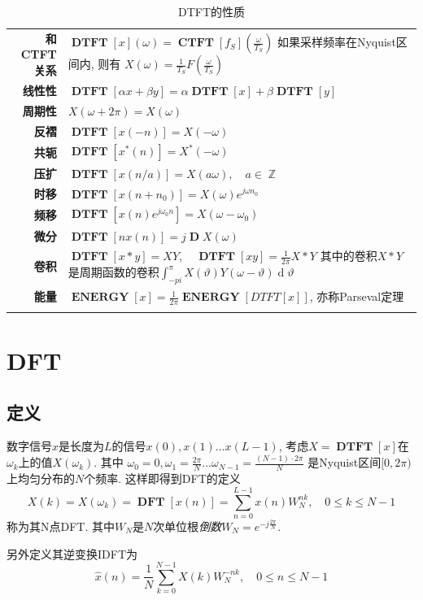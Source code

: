 \documentclass{ctexart}
\DeclareMathOperator{\CTFT}{\mathbf{CTFT}}
\DeclareMathOperator{\DTFT}{\mathbf{DTFT}}
\DeclareMathOperator{\DFT}{\mathbf{DFT}}
\DeclareMathOperator{\ENERGY}{\mathbf{ENERGY}}
\DeclareMathOperator{\D}{\mathbf{D}}
\DeclareMathOperator{\ud}{\mathrm{d}}
\DeclareMathOperator{\Zset}{\mathbb{Z}}
\newlength{\Oldarrayrulewidth}
\newcommand{\Hline}[1]{
  \noalign{\global\setlength{\Oldarrayrulewidth}{\arrayrulewidth}}
  \noalign{\global\setlength{\arrayrulewidth}{#1}}\hline
  \noalign{\global\setlength{\arrayrulewidth}{\Oldarrayrulewidth}}}
\newcommand{\Topline}{\Hline{0.08em}}
\newcommand{\Bottomline}{\Hline{0.08em}}
\begin{document}
    \begin{table}[ht!]
    \begin{tabularx}{\textwidth}{|>{\bfseries}r  L|}
        \Topline
        和CTFT关系 & $\displaystyle \DTFT[x](\omega) = \CTFT[f_S](\frac{\omega}{T_S})$
            如果采样频率在Nyquist区间内, 则有 $X(\omega) = \frac{1}{T_S} F\left(\frac{\omega}{T_S}\right)$\\
        线性性 & $\displaystyle \DTFT[\alpha x + \beta y] = \alpha \DTFT[x] + \beta \DTFT[y]$\\
        周期性 & $\displaystyle X(\omega + 2\pi) = X(\omega)$\\
        反褶 & $\displaystyle \DTFT[x(-n)] = X(-\omega)$\\
        共轭 & $\displaystyle \DTFT[x^*(n)] = X^*(-\omega)$\\
        压扩 & $\displaystyle \DTFT[x(n/a)] = X(a\omega), \quad a \in \Zset$\\
        时移 & $\displaystyle \DTFT[x(n + n_0)] = X(\omega) e^{j \omega n_0}$\\
        频移 & $\displaystyle \DTFT[x(n) e^{j \omega_0 n}] = X(\omega - \omega_0)$\\
        微分 & $\displaystyle \DTFT[nx(n)] = j \D X(\omega)$\\
        卷积 & $\displaystyle \DTFT[x * y] = X Y,\quad \DTFT[x y] = \frac{1}{2\pi} X * Y$
            其中的卷积$X * Y$是周期函数的卷积$\int_{-pi}^{\pi} X(\vartheta) Y(\omega - \vartheta) \ud \vartheta$\\
        能量 & $\displaystyle \ENERGY[x] = \frac{1}{2\pi} \ENERGY[DTFT[x]]$, 亦称Parseval定理\\
        \Bottomline
    \end{tabularx}
    \caption{DTFT的性质}
    \end{table}

\clearpage

\section{DFT}
\subsection{定义}
    数字信号$x$是长度为$L$的信号$x(0), x(1) \ldots x(L - 1)$,
    考虑$X = \DTFT[x]$在$\omega_k$上的值$X(\omega_k)$. 其中
    $\omega_0 = 0, \omega_1 = \frac{2\pi}{N} \ldots \omega_{N - 1} = \frac{(N-1) \cdot 2\pi}{N}$
    是Nyquist区间$[0, 2\pi)$上均匀分布的$N$个频率. 这样即得到DFT的定义
    \[
        X(k) = X(\omega_k) = \DFT[x(n)] = \sum_{n = 0}^{L - 1} x(n) W_N^{nk},\quad 0 \le k \le N - 1\]
    称为其N点DFT. 其中$W_N$是$N$次单位根\emph{倒数}$W_N = e^{- j \frac{2 \pi}{N}}$.\par
    另外定义其逆变换IDFT为\[
        \hat{x}(n) = \frac{1}{N} \sum_{k = 0}^{N - 1} X(k) W_N^{-nk},\quad 0 \le n  \le N -1 \]
\end{document}
